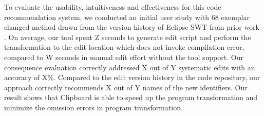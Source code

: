 









To evaluate the usability, intuitiveness and effectiveness for this code recommendation system, we conducted an initial user study with 68 exemplar changed method drawn from the version history of Eclipse SWT from prior work \cite{meng:lase, john:cookbook} .  On average, our tool spent Z seconds to generate edit script and perform the transformation to the edit location which does not invoke compilation error, compared to W seconds in manual edit effort without the tool support. Our consequence evaluation correctly addressed X out of Y systematic edits with an accuracy of X\%. Compared to the edit version history in the code repository, our approach correctly recommends X out of Y names of the new identifiers. Our result shows that Clipboard is able to speed up the program transformation and minimize the omission errors in program transformation. 

